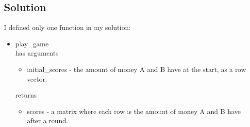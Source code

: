 \documentclass{article}
\begin{document}
\subsection{Solution}
I defined only one function in my solution:
\begin{itemize}
    \item play\_game \\
          has arguments
          \begin{itemize}
              \item initial\_scores - the amount of money A and B have at the start, as a row vector.
          \end{itemize}
          returns
          \begin{itemize}
              \item scores - a matrix where each row is the amount of money A and B have after a round.
          \end{itemize}
\end{itemize}
\newpage
\end{document}
